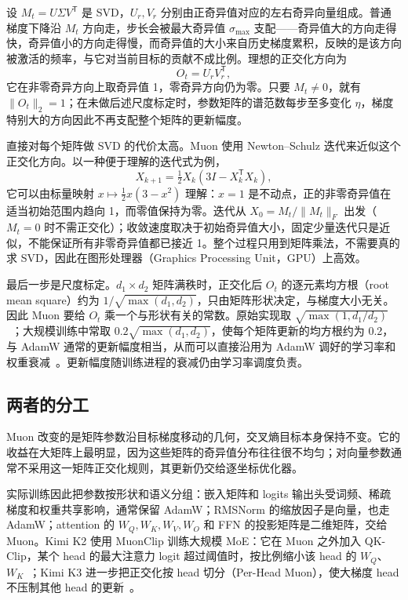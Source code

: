 设 \(M_t=U\Sigma V^\mathsf T\) 是 SVD，\(U_r,V_r\) 分别由正奇异值对应的左右奇异向量组成。普通梯度下降沿 \(M_t\) 方向走，步长会被最大奇异值 \(\sigma_{\max}\) 支配——奇异值大的方向走得快，奇异值小的方向走得慢，而奇异值的大小来自历史梯度累积，反映的是该方向被激活的频率，与它对当前目标的贡献不成比例。理想的正交化方向为
\begin{equation}
 O_t=U_r V_r^\mathsf T,
\end{equation}
它在非零奇异方向上取奇异值 1，零奇异方向仍为零。只要 \(M_t\neq0\)，就有 \(\|O_t\|_2=1\)；在未做后述尺度标定时，参数矩阵的谱范数每步至多变化 \(\eta\)，梯度特别大的方向因此不再支配整个矩阵的更新幅度。

直接对每个矩阵做 SVD 的代价太高。Muon 使用 Newton--Schulz 迭代来近似这个正交化方向。以一种便于理解的迭代式为例，
\begin{equation}
 X_{k+1}=\tfrac12 X_k\left(3I-X_k^\mathsf TX_k\right),
\end{equation}
它可以由标量映射 \(x\mapsto\frac12x(3-x^2)\) 理解：\(x=1\) 是不动点，正的非零奇异值在适当初始范围内趋向 1，而零值保持为零。迭代从 \(X_0=M_t/\|M_t\|_F\) 出发（\(M_t=0\) 时不需正交化）；收敛速度取决于初始奇异值大小，固定少量迭代只是近似，不能保证所有非零奇异值都已接近 1。整个过程只用到矩阵乘法，不需要真的求 SVD，因此在图形处理器（Graphics Processing Unit，GPU）上高效。

最后一步是尺度标定。\(d_1\times d_2\) 矩阵满秩时，正交化后 \(O_t\) 的逐元素均方根（root mean square）约为 \(1/\sqrt{\max(d_1,d_2)}\)，只由矩阵形状决定，与梯度大小无关。因此 Muon 要给 \(O_t\) 乘一个与形状有关的常数。原始实现取 \(\sqrt{\max(1,d_1/d_2)}\)~\cite{jordan2024muon}；大规模训练中常取 \(0.2\sqrt{\max(d_1,d_2)}\)，使每个矩阵更新的均方根约为 0.2，与 AdamW 通常的更新幅度相当，从而可以直接沿用为 AdamW 调好的学习率和权重衰减~\cite{liu2025muon}。更新幅度随训练进程的衰减仍由学习率调度负责。

\subsection{两者的分工}

Muon 改变的是矩阵参数沿目标梯度移动的几何，交叉熵目标本身保持不变。它的收益在大矩阵上最明显，因为这些矩阵的奇异值分布往往很不均匀；对向量参数通常不采用这一矩阵正交化规则，其更新仍交给逐坐标优化器。

实际训练因此把参数按形状和语义分组：嵌入矩阵和 logits 输出头受词频、稀疏梯度和权重共享影响，通常保留 AdamW；RMSNorm 的缩放因子是向量，也走 AdamW；attention 的 \(W_Q,W_K,W_V,W_O\) 和 FFN 的投影矩阵是二维矩阵，交给 Muon。Kimi K2 使用 MuonClip 训练大规模 MoE：它在 Muon 之外加入 QK-Clip，某个 head 的最大注意力 logit 超过阈值时，按比例缩小该 head 的 \(W_Q\)、\(W_K\)~\cite{kimik2}；Kimi K3 进一步把正交化按 head 切分（Per-Head Muon），使大梯度 head 不压制其他 head 的更新~\cite{kimik3}。

